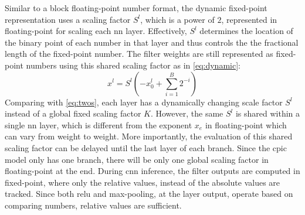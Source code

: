 \documentclass{article}
\begin{document}
Similar to a block floating-point number format, the dynamic fixed-point representation uses a scaling factor $S^l$, which is a power of $2$, represented in floating-point for scaling each \gls{nn} layer.
Effectively, $S^l$ determines the location of the binary point of each number in that layer and thus controls the the fractional length of the fixed-point number.
The filter weights are still represented as fixed-point numbers using this shared scaling factor as in \eqref{eq:dynamic}:
%
\begin{equation}
x^l = S^l \left( -x_0^l + \sum_{i=1}^B 2^{-i} \right)
\label{eq:dynamic}
\end{equation}
%
Comparing with \eqref{eq:twos}, each layer has a dynamically changing scale factor $S^l$ instead of a global fixed scaling factor $K$.
However, the same $S^l$ is shared within a single \gls{nn} layer, which is different from the exponent $x_e$ in floating-point which can vary from weight to weight.
More importantly, the evaluation of this shared scaling factor can be delayed until the last layer of each branch.
Since the \gls{cpic} model only has one branch, there will be only one global scaling factor in floating-point at the end.
During \gls{cnn} inference, the filter outputs are computed in fixed-point, where only the relative values, instead of the absolute values are tracked.
Since both \gls{relu} and max-pooling, at the layer output, operate based on comparing numbers, relative values are sufficient.
\end{document}
